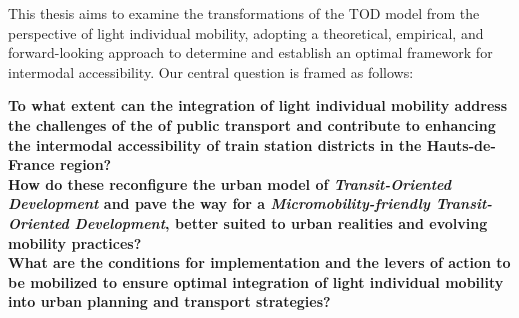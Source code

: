 \begin{refsegment}
This thesis aims to examine the transformations of the \acrshort{TOD} model from the perspective of light individual mobility, adopting a theoretical, empirical, and forward-looking approach to determine and establish an optimal framework for \gls{intermodal accessibility}. Our central question is framed as follows:
    \begin{displayquote}
\textbf{To what extent can the integration of light individual mobility address the challenges of the  of public transport and contribute to enhancing the intermodal accessibility of train station districts in the Hauts-de-France region? \\
How do these  reconfigure the urban model of \textsl{Transit-Oriented Development} and pave the way for a \textsl{Micromobility-friendly Transit-Oriented Development}, better suited to urban realities and evolving mobility practices? \\
What are the conditions for implementation and the levers of action to be mobilized to ensure optimal integration of light individual mobility into urban planning and transport strategies?}
    \end{displayquote}%


\end{refsegment}
